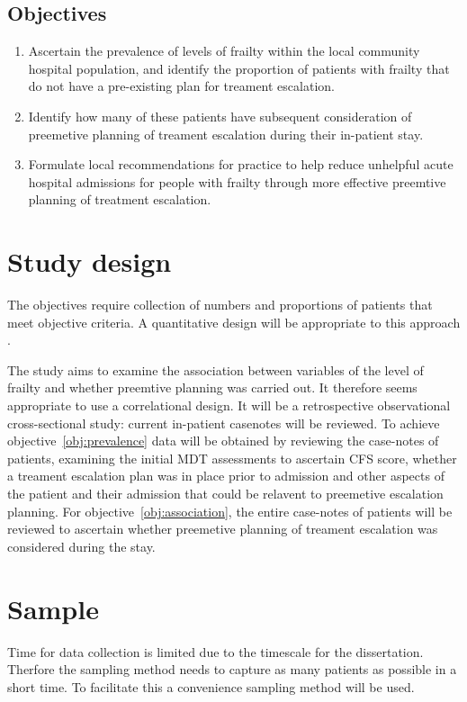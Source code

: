 \documentclass
[
	12pt,
	a4paper,
	oneside,
]{article}
\begin{document}
\subsection{Objectives}

\begin{enumerate}
\item	Ascertain the prevalence of levels of frailty within the local community
		hospital population, and identify the proportion of patients with frailty 
		that do not have a pre-existing plan for treament escalation. \label{obj:prevalence}
\item	Identify how many of these patients have subsequent consideration of preemetive planning
		of treament escalation during their in-patient stay. \label{obj:association}
\item	Formulate local recommendations for practice to help reduce unhelpful
		acute hospital admissions for people with frailty through more effective
		preemtive planning of treatment escalation.
\end{enumerate}

\section{Study design} 
\label{sec:design}
The objectives require collection of numbers
and proportions of patients that meet objective criteria. A quantitative design
will be appropriate to this approach \parencite{parahoo:14}.

The study aims to examine the association between variables of 
the level of frailty and whether preemtive planning
was carried out. It therefore seems appropriate to use a correlational design. 
It will be a retrospective observational 
cross-sectional study: current in-patient casenotes will be reviewed. To achieve 
objective~\ref{obj:prevalence}
data will be obtained by reviewing the case-notes
of patients, examining the initial MDT assessments to ascertain CFS score, 
whether a treament escalation plan was in place prior to admission and other aspects
of the patient and their admission that could be relavent to preemetive escalation
planning. For objective~\ref{obj:association}, the entire case-notes of patients 
will be reviewed to ascertain whether preemetive planning of treament escalation 
was considered during the stay. 

\section{Sample}
Time for data collection is limited due to the timescale for the dissertation. 
Therfore the sampling method needs to capture as many patients as possible in a 
short time. To facilitate this a convenience sampling method will be used.
\end{document}
